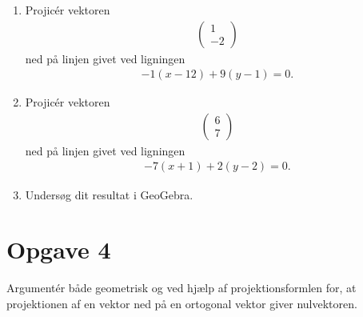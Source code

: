 \begin{enumerate}[label=\roman*)]
	\item Projicér vektoren 
	\begin{align*}
		\begin{pmatrix}
			1 \\ -2
		\end{pmatrix}
	\end{align*}
	ned på linjen givet ved ligningen
	\begin{align*}
		-1(x-12) + 9(y-1) = 0.
	\end{align*}
	\item Projicér vektoren 
	\begin{align*}
		\begin{pmatrix}
			6 \\  7
		\end{pmatrix}
	\end{align*}
	ned på linjen givet ved ligningen
	\begin{align*}
		-7(x+1) + 2(y-2) = 0.
	\end{align*}
	\item Undersøg dit resultat i GeoGebra.
\end{enumerate}

\section*{Opgave 4}
Argumentér både geometrisk og ved hjælp af projektionsformlen for, at projektionen af en vektor ned på en ortogonal vektor giver nulvektoren. 